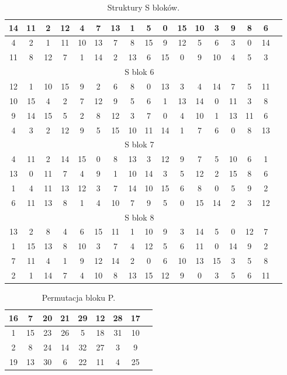 \documentclass[12p]{article}
\begin{document}
\begin{table}[H]
\begin{adjustbox}{width=0.8\textwidth}
\begin{tabular}{|c|c|c|c|c|c|c|c|c|c|c|c|c|c|c|c|c|}
14& 	11& 	2& 	12& 	4& 	7& 	13& 	1& 	5& 	0& 	15& 	10& 	3& 	9& 	8& 	6\\ \hline
4& 	2& 	1& 	11& 	10& 	13& 	7& 	8& 	15& 	9& 	12& 	5& 	6& 	3& 	0& 	14\\ \hline
11& 	8& 	12& 	7& 	1& 	14& 	2& 	13& 	6& 	15& 	0& 	9& 	10& 	4& 	5& 	3\\ \hline 
\multicolumn{16}{|c|}{S blok 6}\\ \hline
12& 	1& 	10& 	15& 	9& 	2& 	6& 	8& 	0& 	13& 	3& 	4& 	14& 	7& 	5& 	11\\ \hline
10 &	15& 	4& 	2& 	7& 	12& 	9& 	5& 	6& 	1& 	13& 	14& 	0& 	11& 	3& 	8\\ \hline
9& 	14& 	15& 	5& 	2& 	8& 	12& 	3& 	7& 	0& 	4& 	10& 	1& 	13& 	11& 	6\\ \hline
4& 	3& 	2& 	12& 	9& 	5& 	15& 	10& 	11& 	14& 	1& 	7& 	6& 	0& 	8& 	13\\ \hline
\multicolumn{16}{|c|}{S blok 7}\\ \hline
4& 	11& 	2& 	14& 	15& 	0& 	8& 	13& 	3& 	12& 	9& 	7& 	5& 	10& 	6& 	1\\ \hline
13& 	0& 	11& 	7& 	4& 	9& 	1& 	10& 	14& 	3& 	5& 	12& 	2& 	15& 	8& 	6\\ \hline
1& 	4& 	11& 	13& 	12& 	3& 	7& 	14& 	10& 	15& 	6& 	8& 	0& 	5& 	9& 	2\\ \hline
6& 	11& 	13& 	8& 	1& 	4& 	10& 	7& 	9& 	5& 	0& 	15& 	14& 	2& 	3& 	12\\ \hline 
\multicolumn{16}{|c|}{S blok 8}\\ \hline
13& 	2& 	8& 	4& 	6& 	15& 	11& 	1& 	10& 	9& 	3& 	14& 	5& 	0& 	12& 	7\\ \hline
1& 	15& 	13& 	8& 	10& 	3& 	7& 	4& 	12& 	5& 	6& 	11& 	0& 	14& 	9& 	2\\ \hline
7& 	11& 	4& 	1& 	9& 	12& 	14& 	2& 	0& 	6& 	10& 	13& 	15& 	3& 	5& 	8\\ \hline
2& 	1& 	14& 	7& 	4& 	10& 	8& 	13& 	15& 	12& 	9& 	0& 	3& 	5& 	6& 	11 \\ \hline
\end{tabular}
\end{adjustbox}
\caption{Struktury S bloków.}\label{s_bloki}
\end{table}



\begin{table}[H]
\centering
\begin{tabular}{|c|c|c|c|c|c|c|c|c|}
\hline
16 &	7 &	20& 	21& 	29& 	12& 	28& 	17\\ \hline
1 &	15& 	23& 	26& 	5& 	18& 	31& 	10\\ \hline
2 &	8 &	24 &	14& 	32& 	27& 	3 &	9\\ \hline
19 	&13 &	30& 	6& 	22& 	11& 	4& 	25\\ \hline
\end{tabular}
\caption{Permutacja bloku P.}~\label{blok_P}
\end{table}
\end{document}

